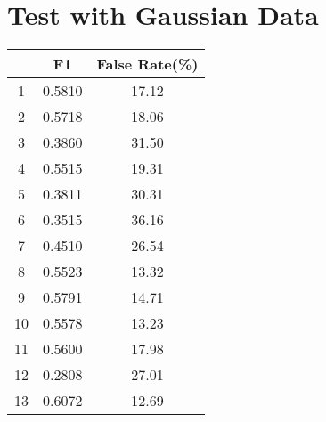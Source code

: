 \documentclass[10pt,a4paper]{article}
\begin{document}
	\section*{Test with Gaussian Data}
		\centering
		\begin{tabular}{|c|c|c|}
			\hline 
			& F1 & False Rate(\%) \\ 
			\hline 
			1 & 0.5810 & 17.12 \\ 
			\hline 
			2 & 0.5718 & 18.06 \\ 
			\hline 
			3 & 0.3860 & 31.50 \\ 
			\hline 
			4 & 0.5515 & 19.31 \\ 
			\hline 
			5 & 0.3811 & 30.31 \\ 
			\hline 
			6 & 0.3515 & 36.16 \\ 
			\hline 
			7 & 0.4510 & 26.54 \\ 
			\hline 
			8 & 0.5523 & 13.32 \\ 
			\hline 
			9 & 0.5791 & 14.71 \\ 
			\hline 
			10 & 0.5578 & 13.23 \\ 
			\hline 
			11 & 0.5600 & 17.98 \\ 
			\hline 
			12 & 0.2808 & 27.01 \\ 
			\hline 
			13 & 0.6072 & 12.69 \\ 
			\hline 
		\end{tabular} 
	
\end{document}

